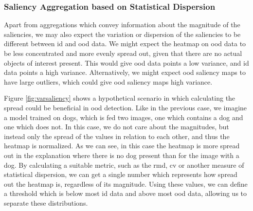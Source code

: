 \documentclass[UKenglish]{uiomasterthesis} %
\theoremstyle{definition}
\begin{document}
\subsubsection{Saliency Aggregation based on Statistical Dispersion}

Apart from aggregations which convey information about the magnitude of the saliencies, we may also expect the variation or dispersion of the saliencies to be different between \ac{id} and \ac{ood} data. We might expect the heatmap on \ac{ood} data to be less concentrated and more evenly spread out, given that there are no actual objects of interest present. This would give \ac{ood} data points a low variance, and \ac{id} data points a high variance. Alternatively, we might expect \ac{ood} saliency maps to have large outliers, which could give \ac{ood} saliency maps high variance.

Figure \ref{fig:varsaliency} shows a hypothetical scenario in which calculating the spread could be beneficial in \ac{ood} detection. Like in the previous case, we imagine a model trained on dogs, which is fed two images, one which contains a dog and one which does not. In this case, we do not care about the magnitudes, but instead only the spread of the values in relation to each other, and thus the heatmap is normalized. As we can see, in this case the heatmap is more spread out in the explanation where there is no dog present than for the image with a dog. By calculating a suitable metric, such as the \ac{rmd}, \ac{cv} or another measure of statistical dispersion, we can get a single number which represents how spread out the heatmap is, regardless of its magnitude. Using these values, we can define a threshold which is below most \ac{id} data and above most \ac{ood} data, allowing us to separate these distributions.
\end{document}
